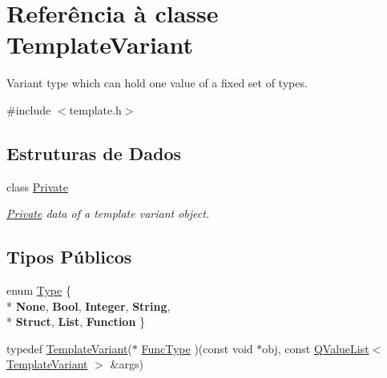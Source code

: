 \hypertarget{class_template_variant}{\section{Referência à classe Template\-Variant}
\label{class_template_variant}
}


Variant type which can hold one value of a fixed set of types.  




{\ttfamily \#include $<$template.\-h$>$}

\subsection*{Estruturas de Dados}
\begin{DoxyCompactItemize}
\item 
class \hyperlink{class_template_variant_1_1_private}{Private}
\begin{DoxyCompactList}\small\item\em \hyperlink{class_template_variant_1_1_private}{Private} data of a template variant object. \end{DoxyCompactList}\end{DoxyCompactItemize}
\subsection*{Tipos Públicos}
\begin{DoxyCompactItemize}
\item 
enum \hyperlink{class_template_variant_a1d1cfd8ffb84e947f82999c682b666a7}{Type} \{ \\*
{\bfseries None}, 
{\bfseries Bool}, 
{\bfseries Integer}, 
{\bfseries String}, 
\\*
{\bfseries Struct}, 
{\bfseries List}, 
{\bfseries Function}
 \}
\item 
typedef \hyperlink{class_template_variant}{Template\-Variant}($\ast$ \hyperlink{class_template_variant_a9048747cd5dd98f5d42a53664324f7e4}{Func\-Type} )(const void $\ast$obj, const \hyperlink{class_q_value_list}{Q\-Value\-List}$<$ \hyperlink{class_template_variant}{Template\-Variant} $>$ \&args)
\end{DoxyCompactItemize}
